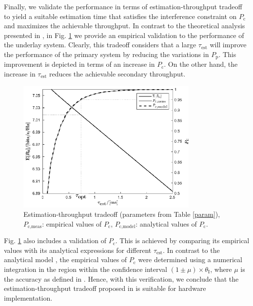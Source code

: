 Finally, we validate the performance in terms of estimation-throughput tradeoff to yield a suitable estimation time that satisfies the interference constraint on $P_\textrm{c}$ and maximizes the achievable throughput. In contrast to the theoretical analysis presented in \cite{Kaushik15}, in Fig. \ref{RspocstricheA} we provide an empirical validation to the performance of the underlay system. Clearly, this tradeoff considers that a large $\tau_\textrm{est}$ will improve the performance of the primary system by reducing the variations in $P_\textrm{p}$. This improvement is depicted in terms of an increase in $P_\textrm{c}$. On the other hand, the increase in $\tau_\textrm{est}$ reduces the achievable secondary throughput.
\begin{figure}
	\centering
	\includegraphics[width=0.8\textwidth]{figures/Rs_poc_striche}
	\caption{Estimation-throughput tradeoff (parameters from Table \ref{param}), $P_\textrm{c,meas}$: empirical values of $P_\textrm{c}$, $P_\textrm{c,model}$: analytical values of $P_\textrm{c}$.}
	\label{RspocstricheA}
\end{figure}
Fig. \ref{RspocstricheA} also includes a validation of $P_\textrm{c}$. This is achieved by comparing its empirical values with its analytical expressions for different $\tau_\textrm{est}$. In contrast to the analytical model \cite{Kaushik15}, the empirical values of $P_\textrm{c}$ were determined using a numerical integration in the region within the confidence interval $(1  \pm \mu)\times \theta_\textrm{I}$, where $\mu$ is the accuracy as defined in \cite{Kaushik15}. Hence, with this verification, we conclude that the estimation-throughput tradeoff proposed in \cite{Kaushik15} is suitable for hardware implementation.


